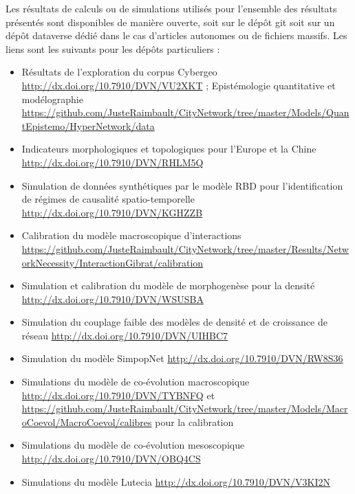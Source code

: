 Les résultats de calculs ou de simulations utilisés pour l'ensemble des résultats présentés sont disponibles de manière ouverte, soit sur le dépôt git soit sur un dépôt dataverse dédié dans le cas d'articles autonomes ou de fichiers massifs. Les liens sont les suivants pour les dépôts particuliers :

\begin{itemize}
	\item Résultats de l'exploration du corpus Cybergeo \url{http://dx.doi.org/10.7910/DVN/VU2XKT} ; Epistémologie quantitative et modélographie \url{https://github.com/JusteRaimbault/CityNetwork/tree/master/Models/QuantEpistemo/HyperNetwork/data}
	\item Indicateurs morphologiques et topologiques pour l'Europe et la Chine \url{http://dx.doi.org/10.7910/DVN/RHLM5Q}
	\item Simulation de données synthétiques par le modèle RBD pour l'identification de régimes de causalité spatio-temporelle \url{http://dx.doi.org/10.7910/DVN/KGHZZB}
	\item Calibration du modèle macroscopique d'interactions \url{https://github.com/JusteRaimbault/CityNetwork/tree/master/Results/NetworkNecessity/InteractionGibrat/calibration}
	\item Simulation et calibration du modèle de morphogenèse pour la densité \url{http://dx.doi.org/10.7910/DVN/WSUSBA}
	\item Simulation du couplage faible des modèles de densité et de croissance de réseau \url{http://dx.doi.org/10.7910/DVN/UIHBC7}
	\item Simulation du modèle SimpopNet \url{http://dx.doi.org/10.7910/DVN/RW8S36}
	\item Simulations du modèle de co-évolution macroscopique \url{http://dx.doi.org/10.7910/DVN/TYBNFQ} et \url{https://github.com/JusteRaimbault/CityNetwork/tree/master/Models/MacroCoevol/MacroCoevol/calibres} pour la calibration
	\item Simulations du modèle de co-évolution mesoscopique \url{http://dx.doi.org/10.7910/DVN/OBQ4CS}
	\item Simulations du modèle Lutecia \url{http://dx.doi.org/10.7910/DVN/V3KI2N}
\end{itemize}













